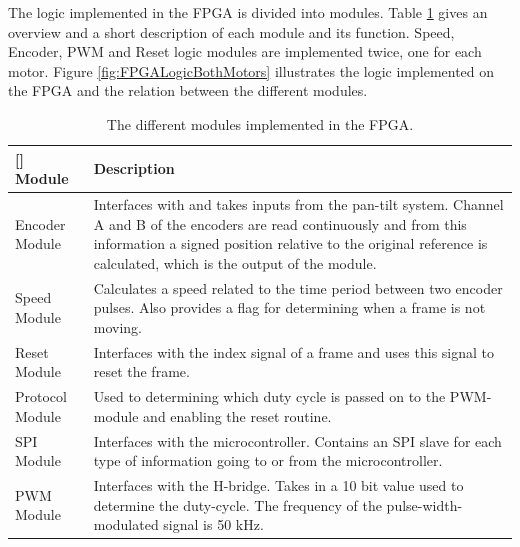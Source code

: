 \documentclass[../../main.tex]{subfiles}
\begin{document}
The logic implemented in the FPGA is divided into modules. Table \ref{tab:FPGAModulesDescription} gives an overview and a short description of each module and its function. Speed, Encoder, PWM and Reset logic modules are implemented twice, one for each motor. Figure \ref{fig:FPGALogicBothMotors} illustrates the logic implemented on the FPGA and the relation between the different modules.     
\begin{table}[]
    \centering
    
    \begin{tabular}{l|p{}}[] %
        Module & Description \\
        \hline
        Encoder Module & Interfaces with and takes inputs from the pan-tilt system. Channel A and B of the encoders are read continuously and from this information a signed position relative to the original reference is calculated, which is the output of the module. \\
        \hline
        Speed Module & Calculates a speed related to the time period between two encoder pulses. Also provides a flag for determining when a frame is not moving.\\
        \hline
        Reset Module & Interfaces with the index signal of a frame and uses this signal to reset the frame. \\
        \hline
        Protocol Module & Used to determining which duty cycle is passed on to the PWM-module and enabling the reset routine. \\
        \hline
        SPI Module & Interfaces with the microcontroller. Contains an SPI slave for each type of information going to or from the microcontroller. \\
        \hline
        PWM Module & Interfaces with the H-bridge. Takes in a 10 bit value used to determine the duty-cycle. The frequency of the pulse-width-modulated signal is 50 kHz.
    \end{tabular}    
    
    \caption{The different modules implemented in the FPGA.}
    \label{tab:FPGAModulesDescription}
\end{table}
\end{document}
